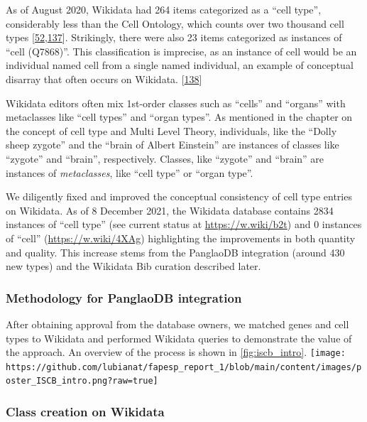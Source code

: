 As of August 2020, Wikidata had 264 items categorized as a ``cell type'', considerably less than the Cell Ontology, which counts over two thousand cell types {[}\protect\hyperlink{ref-agnqfdk6}{52},\protect\hyperlink{ref-4AEy2xhQ}{137}{]}.
Strikingly, there were also 23 items categorized as instances of ``cell (Q7868)''.
This classification is imprecise, as an instance of cell would be an individual named cell from a single named individual, an example of conceptual disarray that often occurs on Wikidata. {[}\protect\hyperlink{ref-imSZTi52}{138}{]}

Wikidata editors often mix 1st-order classes such as ``cells'' and ``organs'' with metaclasses like ``cell types'' and ``organ types''.
As mentioned in the chapter on the concept of cell type and Multi Level Theory, individuals, like the ``Dolly sheep zygote'' and the ``brain of Albert Einstein'' are instances of classes like ``zygote'' and ``brain'', respectively.
Classes, like ``zygote'' and ``brain'' are instances of \emph{metaclasses}, like ``cell type'' or ``organ type''.

We diligently fixed and improved the conceptual consistency of cell type entries on Wikidata.
As of 8 December 2021, the Wikidata database contains 2834 instances of ``cell type'' (see current status at \url{https://w.wiki/b2t}) and 0 instances of ``cell'' (\url{https://w.wiki/4XAg}) highlighting the improvements in both quantity and quality.
This increase stems from the PanglaoDB integration (around 430 new types) and the Wikidata Bib curation described later.

\hypertarget{methodology-for-panglaodb-integration}{%
\subsubsection{Methodology for PanglaoDB integration}\label{methodology-for-panglaodb-integration}}

After obtaining approval from the database owners, we matched genes and cell types to Wikidata and performed Wikidata queries to demonstrate the value of the approach.
An overview of the process is shown in \ref{fig:iscb_intro}.
\texttt{[image: https://github.com/lubianat/fapesp\_report\_1/blob/main/content/images/poster\_ISCB\_intro.png?raw=true]}

\hypertarget{class-creation-on-wikidata}{%
\subsubsection{Class creation on Wikidata}\label{class-creation-on-wikidata}}

